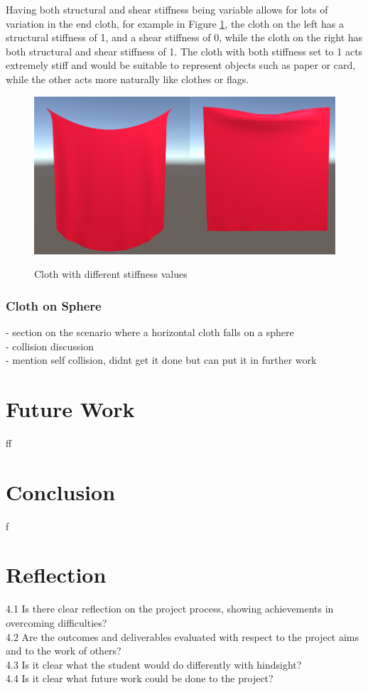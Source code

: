 \documentclass[12pt,a4paper]{article}
\begin{document}
Having both structural and shear stiffness being variable allows for lots of variation in the end cloth, for example in Figure \ref{fig:pbdcomp}, the cloth on the left has a structural stiffness of 1, and a shear stiffness of 0, while the cloth on the right has both structural and shear stiffness of 1. The cloth with both stiffness set to 1 acts extremely stiff and would be suitable to represent objects such as paper or card, while the other acts more naturally like clothes or flags.
\begin{figure}
	\centering
	\caption{Cloth with different stiffness values}
	\includegraphics[scale=0.5]{pbdcomp.png}
	\label{fig:pbdcomp}
\end{figure}

\subsubsection{Cloth on Sphere}
\label{spherescene}
- section on the scenario where a horizontal cloth falls on a sphere\\
- collision discussion\\
- mention self collision, didnt get it done but can put it in further work

\section{Future Work}
ff

\section{Conclusion}
f
\section{Reflection}
4.1 Is there clear reflection on the project process, showing achievements in overcoming difficulties?\\
4.2 Are the outcomes and deliverables evaluated with respect to the project aims and to the work of others?\\
4.3 Is it clear what the student would do differently with hindsight?\\
4.4 Is it clear what future work could be done to the project? \\
\end{document}
